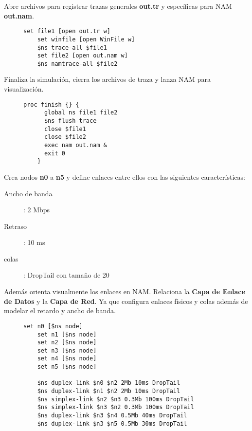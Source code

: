 \noindent Abre archivos para registrar trazas generales \textbf{out.tr} y espec\'ificas para NAM \textbf{out.nam}.
\begin{figure}[H]
  \begin{lstlisting}[frame=single, breaklines=true, basicstyle=\footnotesize\ttfamily, breakatwhitespace=false, 
    columns=flexible, tabsize=2, showstringspaces=false]
    set file1 [open out.tr w]
    set winfile [open WinFile w]
    $ns trace-all $file1
    set file2 [open out.nam w]
    $ns namtrace-all $file2
  \end{lstlisting}
\end{figure}

\noindent Finaliza la simulaci\'on, cierra los archivos de traza y lanza NAM para visualizaci\'on.
\begin{figure}[H]
  \begin{lstlisting}[frame=single, breaklines=true, basicstyle=\footnotesize\ttfamily, breakatwhitespace=false, 
    columns=flexible, tabsize=2, showstringspaces=false]
    proc finish {} {
      global ns file1 file2
      $ns flush-trace
      close $file1
      close $file2
      exec nam out.nam &
      exit 0
    }
  \end{lstlisting}
\end{figure}

\noindent Crea nodos \textbf{n0} a \textbf{n5} y define enlaces entre ellos con las siguientes caracter\'isticas:
\begin{description}
  \item[Ancho de banda] : 2 Mbps
  \item[Retraso] : 10 ms
  \item[colas] : DropTail con tamaño de 20
\end{description}
\noindent Adem\'as orienta visualmente los enlaces en NAM. Relaciona la \textbf{Capa de Enlace de Datos} y la \textbf{Capa de Red}.
Ya que configura enlaces f\'isicos y colas adem\'as de modelar el retardo y ancho de banda.
\begin{figure}[H]
  \begin{lstlisting}[frame=single, breaklines=true, basicstyle=\footnotesize\ttfamily, breakatwhitespace=false, 
    columns=flexible, tabsize=2, showstringspaces=false]
    set n0 [$ns node]
    set n1 [$ns node]
    set n2 [$ns node]
    set n3 [$ns node]
    set n4 [$ns node]
    set n5 [$ns node]

    $ns duplex-link $n0 $n2 2Mb 10ms DropTail
    $ns duplex-link $n1 $n2 2Mb 10ms DropTail
    $ns simplex-link $n2 $n3 0.3Mb 100ms DropTail
    $ns simplex-link $n3 $n2 0.3Mb 100ms DropTail
    $ns duplex-link $n3 $n4 0.5Mb 40ms DropTail
    $ns duplex-link $n3 $n5 0.5Mb 30ms DropTail
  \end{lstlisting}
\end{figure}

